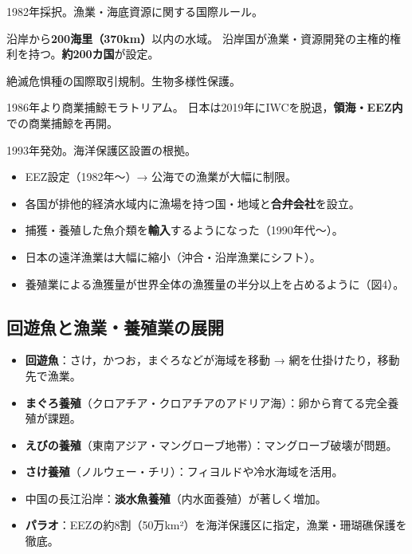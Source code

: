 \documentclass[a4paper,11pt]{article}
\newcommand{\imp}[1]{\textbf{\textcolor{mainred}{#1}}}
\newcommand{\key}[1]{\textbf{\textcolor{mainblue}{#1}}}
\begin{document}
\begin{tcolorbox}[sectionbox, title={■ 海洋に関する国際制度}]
\begin{description}[leftmargin=4cm, style=nextline]
  \item[\key{国連海洋法条約}] 1982年採択。漁業・海底資源に関する国際ルール。
  \item[\key{EEZ}（排他的経済水域）] 沿岸から\imp{200海里（370km）}以内の水域。
    沿岸国が漁業・資源開発の主権的権利を持つ。\imp{約200カ国}が設定。
  \item[\key{ワシントン条約}] 絶滅危惧種の国際取引規制。生物多様性保護。
  \item[\key{IWC}（国際捕鯨委員会）] 1986年より商業捕鯨モラトリアム。
    日本は2019年にIWCを脱退，\imp{領海・EEZ内}での商業捕鯨を再開。
  \item[\key{生物多様性条約}] 1993年発効。海洋保護区設置の根拠。
\end{description}

\medskip
\begin{tcolorbox}[warnbox, title={🔑 EEZ設定の影響（超重要）}]
\begin{itemize}[leftmargin=1em]
  \item EEZ設定（1982年〜）→ 公海での漁業が大幅に制限。
  \item 各国が排他的経済水域内に漁場を持つ国・地域と\imp{合弁会社}を設立。
  \item 捕獲・養殖した魚介類を\imp{輸入}するようになった（1990年代〜）。
  \item 日本の遠洋漁業は大幅に縮小（沖合・沿岸漁業にシフト）。
  \item 養殖業による漁獲量が世界全体の漁獲量の半分以上を占めるように（図4）。
\end{itemize}
\end{tcolorbox}
\end{tcolorbox}

\vspace{2mm}

\subsection{回遊魚と漁業・養殖業の展開}

\begin{tcolorbox}[pointbox, title={回遊魚・養殖の特色}]
\begin{itemize}[leftmargin=1em]
  \item \key{回遊魚}：さけ，かつお，まぐろなどが海域を移動 → 網を仕掛けたり，移動先で漁業。
  \item \key{まぐろ養殖}（クロアチア・クロアチアのアドリア海）：卵から育てる完全養殖が課題。
  \item \key{えびの養殖}（東南アジア・マングローブ地帯）：マングローブ破壊が問題。
  \item \key{さけ養殖}（ノルウェー・チリ）：フィヨルドや冷水海域を活用。
  \item 中国の長江沿岸：\key{淡水魚養殖}（内水面養殖）が著しく増加。
  \item \key{パラオ}：EEZの約8割（50万km²）を海洋保護区に指定，漁業・珊瑚礁保護を徹底。
\end{itemize}
\end{tcolorbox}
\end{document}
